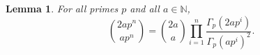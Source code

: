\documentclass[a0]{a0poster}
\newtheorem{lemma}{Lemma}
\newtheorem{proposition}{Proposition}
\theoremstyle{definition}
\newcommand{\naturals}{\mathbb{N}}
\newcommand{\propref}[1]{Proposition \ref{#1}}
\newcommand{\eref}[1]{Equation \ref{#1}}
\newcommand{\thlabel}[1]{\label{#1}}
\providecommand{\floor}[1]{\left \lfloor #1 \right \rfloor }
\begin{document}
\begin{textblock}{7}


\begin{lemma}\thlabel{primepowerfactorial}
For all primes $p$ and all $a\in\mathbb{N}$, $$\binom{2ap^n}{ap^n}=\binom{2a}{a}\prod\limits_{i=1}^n \frac{\Gamma_p(2ap^i)}{\Gamma_p(ap^i)^2}.$$
\end{lemma}





\end{textblock}
\end{document}
